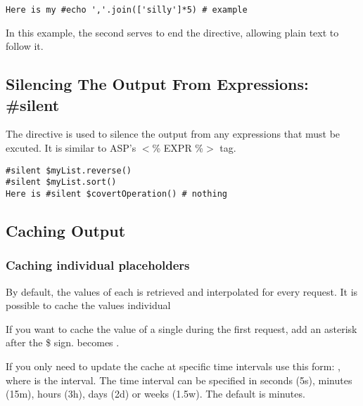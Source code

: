 \begin{verbatim}
Here is my #echo ','.join(['silly']*5) # example 
\end{verbatim}

In this example, the second \code{\#} serves to end the  directive,
allowing plain text to follow it.

\subsection{Silencing The Output From Expressions: \#silent}
\label{output.silent}

The  directive is used to silence the output from any
expressions that must be excuted.  It is similar to ASP's $<$\% EXPR \%$>$ tag.

\begin{verbatim}
#silent $myList.reverse()
#silent $myList.sort()
Here is #silent $covertOperation() # nothing
\end{verbatim}


\subsection{Caching Output}
\label{output.caching}

\subsubsection{Caching individual placeholders}
\label{output.caching.placeholders}

By default, the values of each  is retrieved and
interpolated for every request. It is possible to cache the values individual
                         
If you want to cache the value of a single  during the first
request, add an asterisk after the \$ sign.   becomes .

If you only need to update the cache at specific time intervals use this form:
 , where  is the interval.  The
time interval can be specified in seconds (5s), minutes (15m), hours (3h), days
(2d) or weeks (1.5w). The default is minutes.

